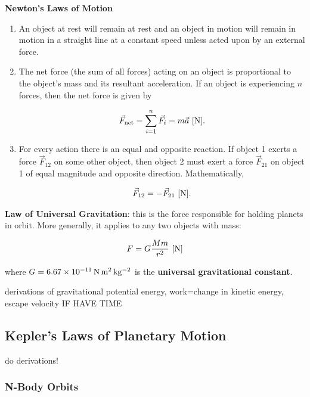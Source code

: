 \documentclass[a4paper,10pt]{article}
\begin{document}
\textbf{Newton's Laws of Motion}
\begin{enumerate}
    \item An object at rest will remain at rest and an object in motion will remain in motion in a straight line at a constant speed unless acted upon by an external force.
    \item The net force (the sum of all forces) acting on an object is proportional to the object’s mass and its resultant acceleration. If an object is experiencing $n$ forces, then the net force is given by

        \begin{align*}
            \vec{F}_{\rm net} = \sum_{i=1}^n \vec{F}_i = m\vec{a}~[{\rm N}].
        \end{align*}

    \item For every action there is an equal and opposite reaction. If object 1 exerts a force $\vec{F}_{12}$ on some other object, then object 2 must exert a force $\vec{F}_{21}$ on object 1 of equal magnitude and opposite direction. Mathematically, 

        \begin{align*}
            \vec{F}_{12} = -\vec{F}_{21}~[{\rm N}].
        \end{align*}
\end{enumerate}

\textbf{Law of Universal Gravitation}: this is the force responsible for holding planets in orbit. More generally, it applies to any two objects with mass: 

\begin{align*}
    F = G\frac{Mm}{r^2}~[{\rm N}]
\end{align*}

where $G=6.67\times 10^{-11}\,{\rm N\,m^2\,kg^{-2}}$ is the \textbf{universal gravitational constant}.

{\Huge derivations of gravitational potential energy, work=change in kinetic energy, escape velocity IF HAVE TIME}

\subsection{Kepler's Laws of Planetary Motion}

{\Huge do derivations!}

\subsubsection{N-Body Orbits}
\end{document}
